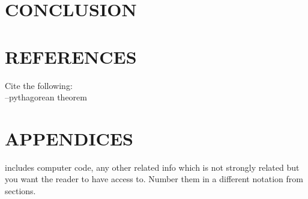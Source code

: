 \documentclass[12pt]{article}
\begin{document}
\section {CONCLUSION}



\section {REFERENCES}
Cite the following:\\
--pythagorean theorem\\


\section {APPENDICES}
includes computer code, any other related info which is not strongly related but you want the reader to have access to. Number them in a different notation from sections.
\end{document}
